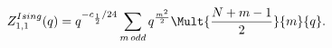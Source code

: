 \begin{equation}
Z_{1,1}^{Ising}(q) = q^{-c_{\frac{1}{2}}/24}
\sum_{m\,odd} q^{\frac{m^2}{2}} \Mult{\frac{N+m-1}{2}}{m}{q}.
\end{equation}

